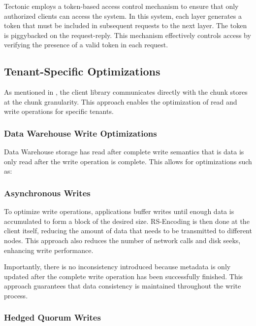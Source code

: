 Tectonic employs a token-based access control mechanism to ensure that only authorized clients can access the system. In this system, each layer generates a token that must be included in subsequent requests to the next layer. The token is piggybacked on the request-reply. This mechanism effectively controls access by verifying the presence of a valid token in each request.

\subsection{Tenant-Specific Optimizations}\label{sec:tenant_specific_optimizations}

As mentioned in , the client library communicates directly with the chunk stores at the chunk granularity. This approach enables the optimization of read and write operations for specific tenants.

\subsubsection{Data Warehouse Write Optimizations}\label{sec:data_warehouse_optimization}

Data Warehouse storage has read after complete write semantics that is data is only read after the write operation is complete. This allows for optimizations such as: 

\subsubsection*{Asynchronous Writes}\label{sec:asynchronous_writes}

To optimize write operations, applications buffer writes until enough data is accumulated to form a block of the desired size. RS-Encoding is then done at the client itself, reducing the amount of data that needs to be transmitted to different nodes. This approach also reduces the number of network calls and disk seeks, enhancing write performance.

Importantly, there is no inconsistency introduced because metadata is only updated after the complete write operation has been successfully finished. This approach guarantees that data consistency is maintained throughout the write process.

\subsubsection*{Hedged Quorum Writes}

